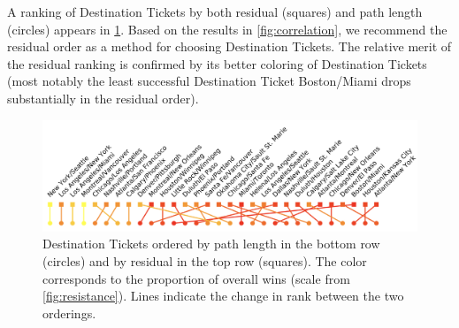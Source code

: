 A ranking of Destination Tickets by both residual (squares)
and path length (circles) appears in \cref{fig:rankings}.
Based on the results in \cref{fig:correlation},
we recommend the residual order as a method for choosing
Destination Tickets.
The relative merit of the residual ranking is confirmed
by its better coloring of Destination Tickets
(most notably the least successful Destination Ticket
Boston/Miami drops substantially in the residual order).

\begin{figure}[H]
    \centering
    \includegraphics[scale=.25]{figures/rankings2.png}
    \caption{Destination Tickets ordered by path length
    in the bottom row (circles) and by residual
    in the top row (squares). The color
    corresponds to the proportion of overall wins (scale
    from \cref{fig:resistance}).
    Lines indicate the change in rank between
    the two orderings.}
    \label{fig:rankings}
\end{figure}
 